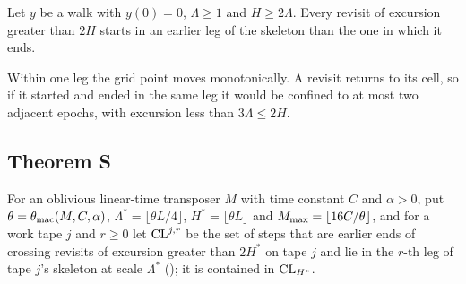 \begin{lemma}\label{lem:legs}
Let $y$ be a walk with $y(0)=0$, $\Lambda\ge1$ and $H\ge2\Lambda$. Every revisit of excursion greater than $2H$ starts in an earlier
leg of the skeleton than the one in which it ends.
\end{lemma}

\begin{outline}
Within one leg the grid point moves monotonically. A revisit returns to its cell, so if it started and ended in the same leg it
would be confined to at most two adjacent epochs, with excursion less than $3\Lambda\le2H$.
\end{outline}

\subsection{Theorem S}

For an oblivious linear-time transposer $M$ with time constant $C$ and $\alpha>0$, put $\theta=\theta_{\mathrm{mac}}(M,C,\alpha)$,
$\Lambda^*=\lfloor\theta L/4\rfloor$, $H^*=\lfloor\theta L\rfloor$ and $M_{\max}=\lfloor16C/\theta\rfloor$, and for a work tape $j$ and
$r\ge0$ let $\mathrm{CL}^{j,r}$ be the set of steps that are earlier ends of crossing revisits of excursion greater than $2H^*$ on tape $j$
and lie in the $r$-th leg of tape $j$'s skeleton at scale $\Lambda^*$ (); it is contained in $\mathrm{CL}_{H^*}$.

